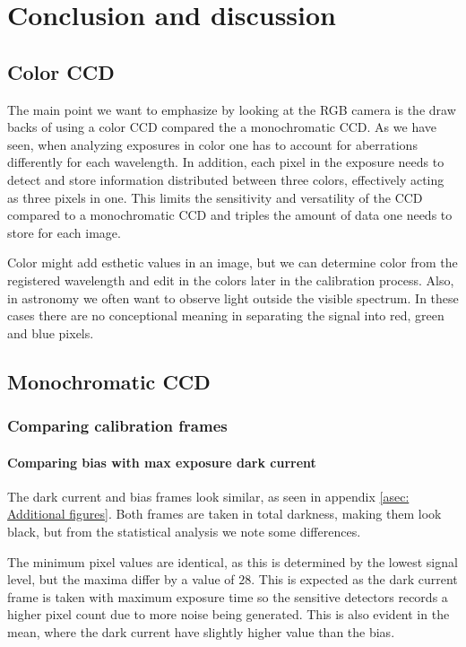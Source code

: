 \documentclass{emulateapj}
\begin{document}
\section{Conclusion and discussion}
\label{sec:conclusion}
\subsection{Color CCD}
The main point we want to emphasize by looking at the RGB camera is the draw backs of using a color CCD compared the a monochromatic CCD. As we have seen, when analyzing exposures in color one has to account for aberrations differently for each wavelength. In addition, each pixel in the exposure needs to detect and store information distributed between three colors, effectively acting as three pixels in one. This limits the sensitivity and versatility of the CCD compared to a monochromatic CCD and triples the amount of data one needs to store for each image.

Color might add esthetic values in an image, but we can determine color from the registered wavelength and edit in the colors later in the calibration process. Also, in astronomy we often want to observe light outside the visible spectrum. In these cases there are no conceptional meaning in separating the signal into red, green and blue pixels.

\subsection{Monochromatic CCD}
\label{subsec: Conclusion/ Monochromatic}

\subsubsection{Comparing calibration frames}
\label{subsubsec: Conclusion/ Comparing calibration frames}
\paragraph{Comparing bias with max exposure dark current}
The dark current and bias frames look similar, as seen in appendix \ref{asec: Additional figures}. Both frames are taken in total darkness, making them look black, but from the statistical analysis we note some differences.

The minimum pixel values are identical, as this is determined by the lowest signal level, but the maxima differ by a value of $28$. This is expected as the dark current frame is taken with maximum exposure time so the sensitive detectors records a higher pixel count due to more noise being generated. This is also evident in the mean, where the dark current have slightly higher value than the bias.
\end{document}

